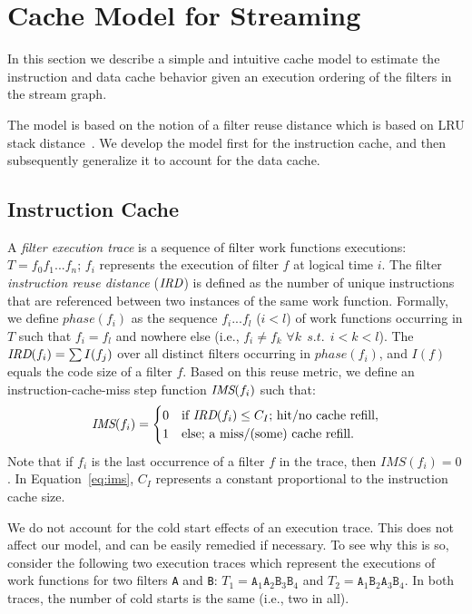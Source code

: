 \section{Cache Model for Streaming}
\label{sec:cache-model}

In this section we describe a simple and intuitive cache model to
estimate the instruction and data cache behavior given an execution
ordering of the filters in the stream graph.

The model is based on the notion of a filter reuse distance which is 
based on LRU stack distance~\cite{mattson70}. We develop the model
first for the instruction cache, and then subsequently generalize it to
account for the data cache.

\subsection{Instruction Cache}

A {\it filter execution trace} is a sequence of 
filter work functions executions: $T = f_0 f_1 ... f_n$; $f_i$ represents the
execution of filter $f$ at logical time $i$.
The filter {\it instruction reuse distance} ($\mbox{\it IRD}$) is defined as the
number of unique instructions that are referenced between two
instances of the same work function. Formally, we define $phase(f_i)$
as the sequence $f_i ... f_l$ ($i < l$) of work functions occurring in
$T$ such that $f_i = f_l$ and nowhere else (i.e., $f_i \neq f_k$
$\forall{k}~~s.t.~~i < k < l$). The $\mbox{\it IRD}(f_i) = \sum I(f_j)$ over all
distinct filters occurring in $phase(f_i)$, and $I(f)$ equals the code
size of a filter $f$. Based on this reuse metric, we define an
instruction-cache-miss step function $\mbox{\it IMS}(f_i)$ such that:
\begin{equation}
\label{eq:ims}
  \mbox{\it IMS}(f_i) =
    \begin{cases}
      0& \text{if $\mbox{\it IRD}(f_i) \leq C_I$; hit/no cache refill},\\
      1& \text{else; a miss/(some) cache refill}.\\
    \end{cases}
\end{equation}
Note that if $f_i$ is the last occurrence of a filter $f$ in the trace,
then $IMS(f_i) = 0$. In Equation~\ref{eq:ims}, $C_I$ represents a
constant proportional to the instruction cache size.

We do not account for the cold start
effects of an execution trace. This does not affect our model, and can
be easily remedied if necessary. To see why this is so, consider the
following two execution traces which represent the executions of work
functions for two filters \texttt{A} and \texttt{B}:
$T_1 = \texttt{A}_1\texttt{A}_2\texttt{B}_3\texttt{B}_4$
and 
$T_2 = \texttt{A}_1\texttt{B}_2\texttt{A}_3\texttt{B}_4$.
In both 
traces, the number of cold starts is the same (i.e., two in all).

